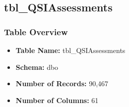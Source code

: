 \begin{landscape}
\subsection{tbl\_QSIAssessments}

\subsubsection{Table Overview}
\begin{itemize}
\item \textbf{Table Name:} tbl\_QSIAssessments
\item \textbf{Schema:} dbo
\item \textbf{Number of Records:} 90,467
\item \textbf{Number of Columns:} 61
\end{itemize}


\end{landscape}
